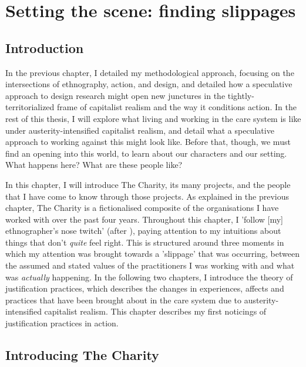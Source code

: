 \chapter{Setting the scene: finding slippages}
\label{4}

\section{Introduction}
\label{4-intro}

In the previous chapter, I detailed my methodological approach, focusing on the intersections of ethnography, action, and design, and detailed how a speculative approach to design research might open new junctures in the tightly-territorialized frame of capitalist realism and the way it conditions action. In the rest of this thesis, I will explore what living and working in the care system is like under austerity-intensified capitalist realism, and detail what a speculative approach to working against this might look like. Before that, though, we must find an opening into this world, to learn about our characters and our setting. What happens here? What are these people like? 

In this chapter, I will introduce The Charity, its many projects, and the people that I have come to know through those projects. As explained in the previous chapter, The Charity is a fictionalised composite of the organisations I have worked with over the past four years. Throughout this chapter, I 'follow [my] ethnographer’s nose twitch' (after \cite{leigh_star_this_2010}), paying attention to my intuitions about things that don’t \textit{quite} feel right. This is structured around three moments in which my attention was brought towards a 'slippage' \citep{cutting_making_2021} that was occurring, between the assumed and stated values of the practitioners I was working with and what was \textit{actually} happening. In the following two chapters, I introduce the theory of justification practices, which describes the  changes in experiences, affects and practices that have been brought about in the care system due to austerity-intensified capitalist realism. This chapter describes my first noticings of justification practices in action.

\section{Introducing The Charity}

